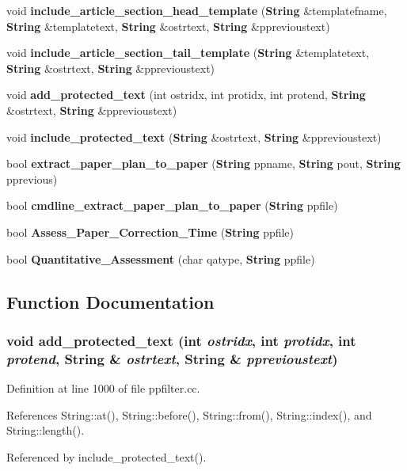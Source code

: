 \begin{CompactItemize}
\item 
void {\bf include\_\-article\_\-section\_\-head\_\-template} ({\bf String} \&templatefname, {\bf String} \&templatetext, {\bf String} \&ostrtext, {\bf String} \&pprevioustext)
\item 
void {\bf include\_\-article\_\-section\_\-tail\_\-template} ({\bf String} \&templatetext, {\bf String} \&ostrtext, {\bf String} \&pprevioustext)
\item 
void {\bf add\_\-protected\_\-text} (int ostridx, int protidx, int protend, {\bf String} \&ostrtext, {\bf String} \&pprevioustext)
\item 
void {\bf include\_\-protected\_\-text} ({\bf String} \&ostrtext, {\bf String} \&pprevioustext)
\item 
bool {\bf extract\_\-paper\_\-plan\_\-to\_\-paper} ({\bf String} ppname, {\bf String} pout, {\bf String} pprevious)
\item 
bool {\bf cmdline\_\-extract\_\-paper\_\-plan\_\-to\_\-paper} ({\bf String} ppfile)
\item 
bool {\bf Assess\_\-Paper\_\-Correction\_\-Time} ({\bf String} ppfile)
\item 
bool {\bf Quantitative\_\-Assessment} (char qatype, {\bf String} ppfile)
\end{CompactItemize}


\subsection{Function Documentation}
\subsubsection{\setlength{\rightskip}{0pt plus 5cm}void add\_\-protected\_\-text (int {\em ostridx}, int {\em protidx}, int {\em protend}, {\bf String} \& {\em ostrtext}, {\bf String} \& {\em pprevioustext})}\label{ppfilter_8cc_a26}




Definition at line 1000 of file ppfilter.cc.

References String::at(), String::before(), String::from(), String::index(), and String::length().

Referenced by include\_\-protected\_\-text().



